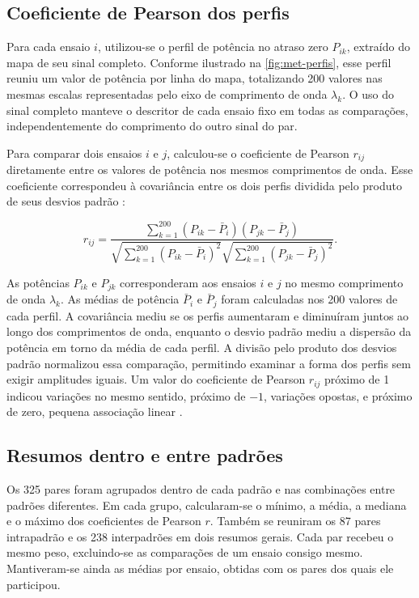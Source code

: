 \FloatBarrier
\subsection{Coeficiente de Pearson dos perfis}\label{sec:met-pearson-perfis}

Para cada ensaio $i$, utilizou-se o perfil
de potência no atraso zero $P_{ik}$, extraído do mapa de seu sinal completo.
Conforme ilustrado na \autoref{fig:met-perfis}, esse perfil reuniu um valor
de potência por linha do mapa, totalizando 200 valores nas mesmas escalas
representadas pelo eixo de comprimento de onda $\lambda_k$. O uso do sinal
completo manteve o descritor de cada ensaio fixo em todas as comparações,
independentemente do comprimento do outro sinal do par.

Para comparar dois ensaios $i$ e $j$, calculou-se o coeficiente de Pearson
$r_{ij}$ diretamente entre os valores de potência nos mesmos comprimentos
de onda. Esse coeficiente correspondeu à covariância entre os dois perfis dividida pelo
produto de seus desvios padrão \cite{cunningham2020}:\nopagebreak[4]

\begin{equation}\label{eq:met-pearson}
  r_{ij}=\frac{\sum_{k=1}^{200}(P_{ik}-\bar P_i)(P_{jk}-\bar P_j)}
   {\sqrt{\sum_{k=1}^{200}(P_{ik}-\bar P_i)^2}
    \sqrt{\sum_{k=1}^{200}(P_{jk}-\bar P_j)^2}}.
\end{equation}

\noindent
As potências $P_{ik}$ e $P_{jk}$ corresponderam aos ensaios $i$ e $j$ no mesmo
comprimento de onda $\lambda_k$. As médias de potência $\bar P_i$ e $\bar P_j$
foram calculadas nos 200 valores de cada perfil. A covariância mediu se os
perfis aumentaram e diminuíram juntos ao longo dos comprimentos de onda,
enquanto o desvio padrão mediu a dispersão da potência em torno da média de
cada perfil. A divisão pelo produto dos desvios padrão normalizou essa
comparação, permitindo examinar a forma dos perfis sem exigir amplitudes iguais.
Um valor do coeficiente de Pearson $r_{ij}$ próximo de 1 indicou variações no
mesmo sentido, próximo de $-1$, variações opostas, e próximo de zero, pequena associação linear
\cite{cunningham2020}.

\subsection{Resumos dentro e entre padrões}\label{sec:met-resumos}

Os 325 pares foram agrupados dentro de cada padrão e nas combinações entre
padrões diferentes. Em cada grupo, calcularam-se o mínimo, a média, a
mediana e o máximo dos coeficientes de Pearson $r$. Também se reuniram
os 87 pares intrapadrão e os 238 interpadrões em dois resumos gerais.
Cada par recebeu o mesmo peso, excluindo-se as comparações de um ensaio
consigo mesmo. Mantiveram-se ainda as médias por ensaio, obtidas com os
pares dos quais ele participou.

